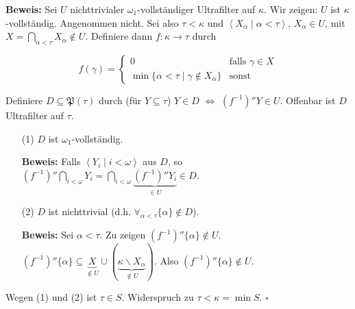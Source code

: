 \documentclass[a4paper,fontsize=11pt]{scrartcl}
\begin{document}
{\bf Beweis:} Sei $U$ nichttrivialer $\omega_1$-vollständiger
Ultrafilter auf $\kappa$. Wir zeigen: $U$ ist
$\kappa$-vollständig. Angenommen nicht. Sei also $\tau<\kappa$ und
$\left<X_\alpha\mid\alpha<\tau\right>$, $X_\alpha\in U$, mit
$X=\bigcap\limits_{\alpha<\tau}X_\alpha\not\in U$. Definiere dann
$f:\kappa\rightarrow\tau$ durch

$$ f(\gamma) = \left\{ \begin{array}{cl} 0 & \mbox{falls }\gamma\in X
  \\ \min\{\alpha<\tau\mid\gamma\not\in X_\alpha\} &
  \mbox{sonst}\end{array}\right. $$

Definiere $D\subseteq\mathfrak{P}(\tau)$ durch (für $Y\subseteq\tau$)
$Y\in D$ $\Leftrightarrow$ $(f^{-1})''Y\in U$. Offenbar ist $D$
Ultrafilter auf $\tau$.
\begin{itemize}
  \item[(1)] $D$ ist $\omega_1$-vollständig.
  \item[] {\bf Beweis:} Falls $\left<Y_i\mid i<\omega\right>$ aus $D$,
    so $(f^{-1})''\bigcap\limits_{i<\omega}Y_i =
    \bigcap\limits_{i<\omega}\underbrace{(f^{-1})''Y_i}_{\in U} \in
    D$.
  \item[(2)] $D$ ist nichttrivial (d.h. $\forall_{\alpha<\tau}
    \{\alpha\}\not\in D$).
  \item[] {\bf Beweis:} Sei $\alpha<\tau$. Zu zeigen
    $(f^{-1})''\{\alpha\}\not\in U$. $(f^{-1})''\{\alpha\}\subseteq
    \underbrace{X}_{\not\in U}\cup (\underbrace{\kappa\backslash
      X_\alpha}_{\not\in U})$. Also $(f^{-1})''\{\alpha\}\not\in U$.
\end{itemize}

Wegen (1) und (2) ist $\tau\in S$. Widerspruch zu $\tau<\kappa=\min
S$. \hfill $\square$
\end{document}
